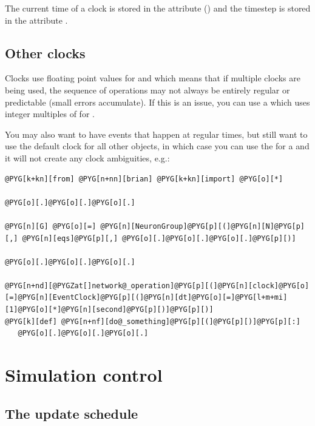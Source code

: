 \documentclass[letterpaper,10pt,english]{manual}
\begin{document}
The current time of a clock is stored in the attribute  () and
the timestep is stored in the attribute .


\subsection{Other clocks}

Clocks use floating point values for  and  which means that if
multiple clocks are being used, the sequence of operations may not always be
entirely regular or predictable (small errors accumulate). If this is an issue,
you can use a \hyperlink{brian.RegularClock}{} which uses integer multiples of  for .

You may also want to have events that happen at regular times, but still want to
use the default clock for all other objects, in which case you can use the
\hyperlink{brian.EventClock}{} for a \hyperlink{brian.network_operation}{} and it will not create any
clock ambiguities, e.g.:

\begin{Verbatim}[commandchars=@\[\]]
@PYG[k+kn][from] @PYG[n+nn][brian] @PYG[k+kn][import] @PYG[o][*]

@PYG[o][.]@PYG[o][.]@PYG[o][.]

@PYG[n][G] @PYG[o][=] @PYG[n][NeuronGroup]@PYG[p][(]@PYG[n][N]@PYG[p][,] @PYG[n][eqs]@PYG[p][,] @PYG[o][.]@PYG[o][.]@PYG[o][.]@PYG[p][)]

@PYG[o][.]@PYG[o][.]@PYG[o][.]

@PYG[n+nd][@PYGZat[]network@_operation]@PYG[p][(]@PYG[n][clock]@PYG[o][=]@PYG[n][EventClock]@PYG[p][(]@PYG[n][dt]@PYG[o][=]@PYG[l+m+mi][1]@PYG[o][*]@PYG[n][second]@PYG[p][)]@PYG[p][)]
@PYG[k][def] @PYG[n+nf][do@_something]@PYG[p][(]@PYG[p][)]@PYG[p][:]
   @PYG[o][.]@PYG[o][.]@PYG[o][.]
\end{Verbatim}

\resetcurrentobjects
\hypertarget{--doc-simulation}{}

\hypertarget{index-117}{}\section{Simulation control}

\hypertarget{index-118}{}\subsection{The update schedule}
\end{document}

